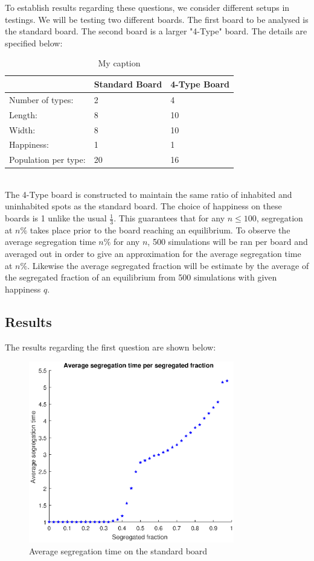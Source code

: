 \documentclass{article}
\begin{document}
To establish results regarding these questions, we consider different setups in testings. We will be testing two different boards.
The first board to be analysed is the standard board. The second board is a larger 
"4-Type" board. The details are specified below:
\begin{table}[h!]
\centering
\caption{My caption}
\label{my-label}
\begin{tabular}{l|l|l}
  & Standard Board & 4-Type Board\\ \hline
Number of types:& 2 & 4 \\ 
 Length:& 8 & 10  \\
 Width:& 8 & 10  \\
 Happiness:& 1 & 1  \\
Population per type: & 20 & 16  
	\end{tabular}
	\end{table}
\\
The 4-Type board is constructed to maintain the same ratio of inhabited and uninhabited spots as the standard board. The choice of happiness on these boards is 1 unlike the usual \(\frac{1}{3}\). 
This guarantees that for any \(n\leq 100\), segregation at \(n\%\) takes place prior to the board reaching an equilibrium. 
To observe the average segregation time \(n\%\) for any \(n\), 500 simulations will be ran per board and averaged out in order to give an approximation for the average segregation time at \(n\%\).
Likewise the average segregated fraction will be estimate by the average of the segregated fraction of an equilibrium from 500 simulations with given happiness \(q\).
\newpage
\subsection{Results}
The results regarding the first question are shown below:\\

\begin{figure}[H]
    \centering
    \includegraphics[width=0.8\textwidth]{aveseg_sb_1}
    \caption{Average segregation time on the standard board}
    \label{fig:avesegsb}
\end{figure}
\end{document}
